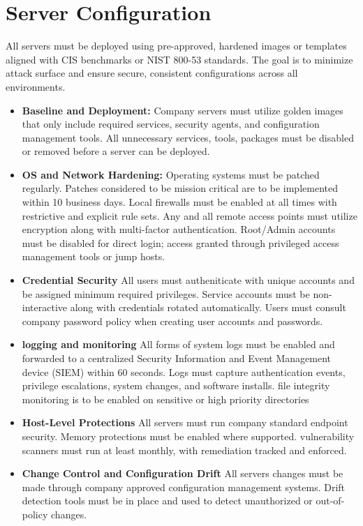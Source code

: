 \section{Server Configuration}
All servers must be deployed using pre-approved, hardened images or templates aligned with CIS benchmarks or NIST 800-53 standards. The goal is to minimize attack surface and ensure secure, consistent configurations across all environments.
\begin{itemize}
    \item \textbf{Baseline and Deployment:}
    Company servers must utilize golden images that only include required services, security agents, and configuration management tools. All unnecessary services, tools, packages must be disabled or removed before a server can be deployed.
    \item \textbf{OS and Network Hardening:}
    Operating systems must be patched regularly. Patches considered to be mission critical are to be implemented within 10 business days. Local firewalls must be enabled at all times with restrictive and explicit rule sets. Any and all remote access points must utilize encryption along with multi-factor authentication. Root/Admin accounts must be disabled for direct login; access granted through privileged access management tools or jump hosts.
    \item \textbf{Credential Security}
    All users must autheniticate with unique accounts and be assigned minimum required privileges. Service accounts must be non-interactive along with credentials rotated automatically. Users must consult company password policy when creating user accounts and passwords.
    \item \textbf{logging and monitoring}
    All forms of system logs must be enabled and forwarded to a centralized Security Information and Event Management device (SIEM) within 60 seconds. Logs must capture authentication events, privilege escalations, system changes, and software installs. file integrity monitoring is to be enabled on sensitive or high priority directories
    \item \textbf{Host-Level Protections}
    All servers must run company standard endpoint security. Memory protections must be enabled where supported. vulnerability scanners must run at least monthly, with remediation tracked and enforced.
    \item \textbf{Change Control and Configuration Drift}
    All servers changes must be made through company approved configuration management systems. Drift detection tools must be in place and used to detect unauthorized or out-of-policy changes.
    
\end{itemize}

